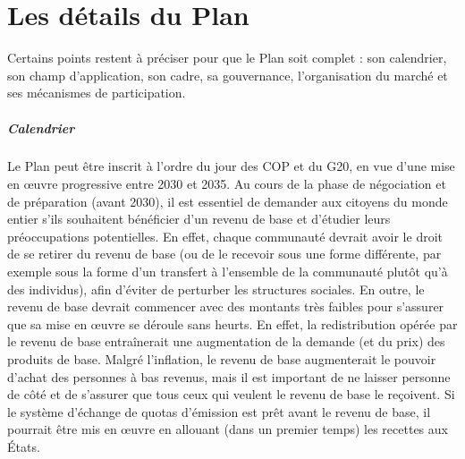 \documentclass[a5paper,french,openany]{memoir}
\begin{document}
\appendix

\chapter{Les détails du Plan\label{ch:details}} 

Certains points restent à préciser pour que le Plan soit complet : son calendrier, son champ d'application, son cadre, sa gouvernance, l'organisation du marché et ses mécanismes de participation. 

\paragraph{Calendrier} 
Le Plan peut être inscrit à l'ordre du jour des COP et du G20, en vue d'une mise en œuvre progressive entre 2030 et 2035. Au cours de la phase de négociation et de préparation (avant 2030), il est essentiel de demander aux citoyens du monde entier s'ils souhaitent bénéficier d'un revenu de base et d'étudier leurs préoccupations potentielles. En effet, chaque communauté devrait avoir le droit de se retirer du revenu de base (ou de le recevoir sous une forme différente, par exemple sous la forme d'un transfert à l'ensemble de la communauté plutôt qu'à des individus), afin d'éviter de perturber les structures sociales. En outre, le revenu de base devrait commencer avec des montants très faibles pour s'assurer que sa mise en œuvre se déroule sans heurts. En effet, la redistribution opérée par le revenu de base entraînerait une augmentation de la demande (et du prix) des produits de base. Malgré l'inflation, le revenu de base augmenterait le pouvoir d'achat des personnes à bas revenus, mais il est important de ne laisser personne de côté et de s'assurer que tous ceux qui veulent le revenu de base le reçoivent. Si le système d'échange de quotas d'émission est prêt avant le revenu de base, il pourrait être mis en œuvre en allouant (dans un premier temps) les recettes aux États.
\end{document}
